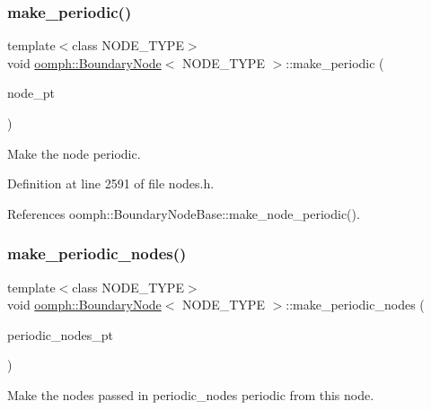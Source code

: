 \subsubsection{\texorpdfstring{make\+\_\+periodic()}{make\_periodic()}}
{\footnotesize\ttfamily template$<$class N\+O\+D\+E\+\_\+\+T\+Y\+PE$>$ \\
void \hyperlink{classoomph_1_1BoundaryNode}{oomph\+::\+Boundary\+Node}$<$ N\+O\+D\+E\+\_\+\+T\+Y\+PE $>$\+::make\+\_\+periodic (\begin{DoxyParamCaption}\item[{\hyperlink{classoomph_1_1Node}{Node} $\ast$const \&}]{node\+\_\+pt }\end{DoxyParamCaption})\hspace{0.3cm}{\ttfamily [inline]}}



Make the node periodic. 



Definition at line 2591 of file nodes.\+h.



References oomph\+::\+Boundary\+Node\+Base\+::make\+\_\+node\+\_\+periodic().

\mbox{\label{classoomph_1_1BoundaryNode_af41beccd082bdd4d2bd6205f374e47f5}} 
\subsubsection{\texorpdfstring{make\+\_\+periodic\+\_\+nodes()}{make\_periodic\_nodes()}}
{\footnotesize\ttfamily template$<$class N\+O\+D\+E\+\_\+\+T\+Y\+PE$>$ \\
void \hyperlink{classoomph_1_1BoundaryNode}{oomph\+::\+Boundary\+Node}$<$ N\+O\+D\+E\+\_\+\+T\+Y\+PE $>$\+::make\+\_\+periodic\+\_\+nodes (\begin{DoxyParamCaption}\item[{const \hyperlink{classoomph_1_1Vector}{Vector}$<$ \hyperlink{classoomph_1_1Node}{Node} $\ast$$>$ \&}]{periodic\+\_\+nodes\+\_\+pt }\end{DoxyParamCaption})\hspace{0.3cm}{\ttfamily [inline]}}



Make the nodes passed in periodic\+\_\+nodes periodic from this node. 



